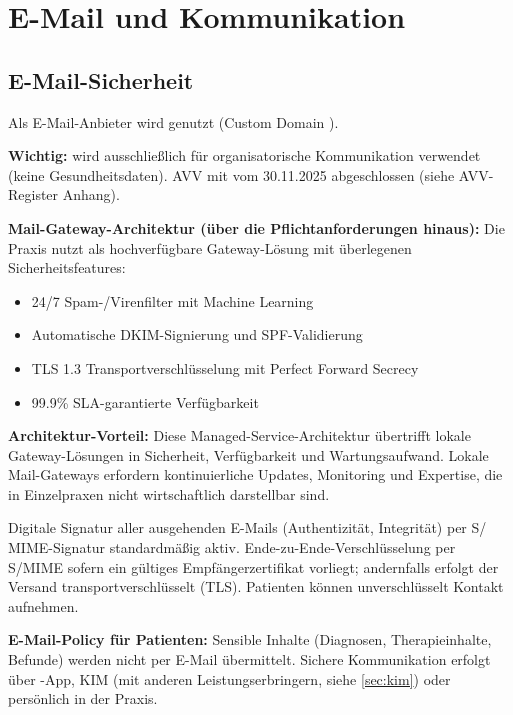 \section{E-Mail und Kommunikation}
\label{sec:kommunikation}

\subsection{E-Mail-Sicherheit}

Als E-Mail-Anbieter wird \EmailAnbieter{} genutzt (Custom Domain \PraxisDomain).

\textbf{Wichtig:} \EmailAnbieter{} wird ausschließlich für organisatorische Kommunikation
verwendet (keine Gesundheitsdaten). AVV mit \EmailAnbieterFirma{}
vom 30.11.2025 abgeschlossen (siehe AVV-Register Anhang).

\textbf{Mail-Gateway-Architektur (über die Pflichtanforderungen hinaus):} Die Praxis nutzt \EmailAnbieter{}
als hochverfügbare Gateway-Lösung mit überlegenen Sicherheitsfeatures:

\begin{itemize}
  \item 24/7 Spam-/Virenfilter mit Machine Learning
  \item Automatische DKIM-Signierung und SPF-Validierung
  \item TLS 1.3 Transportverschlüsselung mit Perfect Forward Secrecy
  \item 99.9\% SLA-garantierte Verfügbarkeit
\end{itemize}

\textbf{Architektur-Vorteil:} Diese Managed-Service-Architektur übertrifft lokale
Gateway-Lösungen in Sicherheit, Verfügbarkeit und Wartungsaufwand. Lokale
Mail-Gateways erfordern kontinuierliche Updates, Monitoring und Expertise,
die in Einzelpraxen nicht wirtschaftlich darstellbar sind.

Digitale Signatur aller ausgehenden E-Mails (Authentizität, Integrität) per S\slash
MIME-Si\-gna\-tur standardmäßig aktiv.
Ende-zu-Ende-Verschlüsselung per S\slash MIME sofern ein gültiges Empfängerzertifikat
vorliegt; andernfalls erfolgt der Versand transportverschlüsselt (TLS). Patienten können
unverschlüsselt Kontakt aufnehmen.

\textbf{E-Mail-Policy für Patienten:} Sensible Inhalte (Diagnosen, Therapieinhalte,
Befunde) werden nicht per E-Mail übermittelt. Sichere Kommunikation erfolgt über
\PatKomTool{}-App, KIM (mit anderen Leistungserbringern, siehe \cref{sec:kim}) oder
persönlich in der Praxis.

